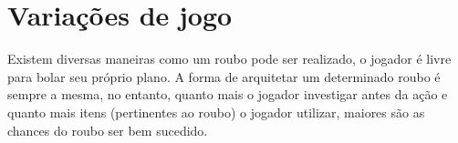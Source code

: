 \section{Variações de jogo}
Existem diversas maneiras como um roubo pode ser realizado, o jogador é livre para bolar seu próprio plano. A forma de arquitetar um determinado roubo é sempre a mesma, no entanto, quanto mais o jogador investigar antes da ação e quanto mais itens (pertinentes ao roubo) o jogador utilizar, maiores são as chances do roubo ser bem sucedido.


